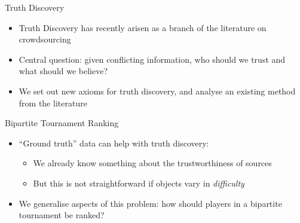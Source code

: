 \documentclass[10pt]{beamer}
\begin{document}
\begin{frame}{Truth Discovery}
    \begin{itemize}
        \item \alert{Truth Discovery} has recently arisen as a branch of the
              literature on crowdsourcing
        \item Central question: given conflicting information, who should we
              trust and what should we believe?
        \item We set out new axioms for truth discovery, and analyse an
              existing method from the literature
    \end{itemize}

    \begin{figure}
        \centering
    \end{figure}

\end{frame}

\begin{frame}{Bipartite Tournament Ranking}
    \begin{itemize}
        \item ``Ground truth'' data can help with truth discovery:
        \begin{itemize}
            \item We already know something about the trustworthiness of
                  sources
            \item But this is not straightforward if objects vary in
                  \emph{difficulty}
        \end{itemize}
        \item We generalise aspects of this problem: how should players in a
              \alert{bipartite tournament} be ranked?
    \end{itemize}

    \begin{figure}
        \centering
    \end{figure}

\end{frame}
\end{document}
